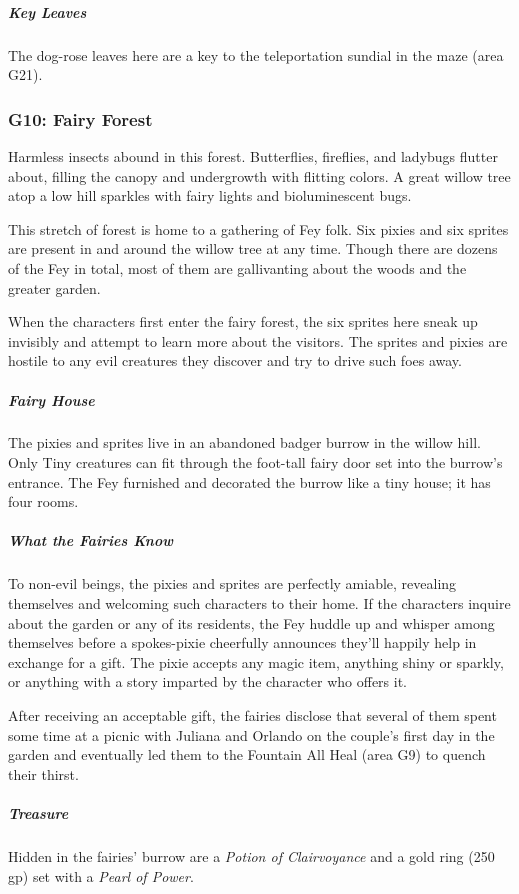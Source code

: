 \documentclass[10pt,a4paper,twoside,bg=print,twocolumn,openany,nodeprecatedcode]{dndbook}
\begin{document}
\subparagraph{Key Leaves}
The dog-rose leaves here are a key to the teleportation sundial in the maze (area G21).

\subsubsection{G10: Fairy Forest}
\begin{DndReadAloud}{}
Harmless insects abound in this forest. Butterflies, fireflies, and ladybugs flutter about, filling the canopy and undergrowth with flitting colors. A great willow tree atop a low hill sparkles with fairy lights and bioluminescent bugs.

\end{DndReadAloud}

This stretch of forest is home to a gathering of Fey folk. Six pixies and six sprites are present in and around the willow tree at any time. Though there are dozens of the Fey in total, most of them are gallivanting about the woods and the greater garden.

When the characters first enter the fairy forest, the six sprites here sneak up invisibly and attempt to learn more about the visitors. The sprites and pixies are hostile to any evil creatures they discover and try to drive such foes away.

\subparagraph{Fairy House}
The pixies and sprites live in an abandoned badger burrow in the willow hill. Only Tiny creatures can fit through the foot-tall fairy door set into the burrow's entrance. The Fey furnished and decorated the burrow like a tiny house; it has four rooms.

\subparagraph{What the Fairies Know}
To non-evil beings, the pixies and sprites are perfectly amiable, revealing themselves and welcoming such characters to their home. If the characters inquire about the garden or any of its residents, the Fey huddle up and whisper among themselves before a spokes-pixie cheerfully announces they'll happily help in exchange for a gift. The pixie accepts any magic item, anything shiny or sparkly, or anything with a story imparted by the character who offers it.

After receiving an acceptable gift, the fairies disclose that several of them spent some time at a picnic with Juliana and Orlando on the couple's first day in the garden and eventually led them to the Fountain All Heal (area G9) to quench their thirst.

\subparagraph{Treasure}
Hidden in the fairies' burrow are a \textit{Potion of Clairvoyance} and a gold ring (250 gp) set with a \textit{Pearl of Power}.
\end{document}
